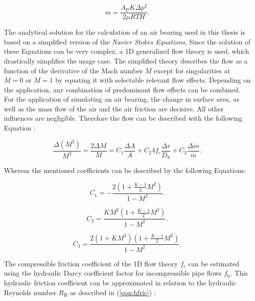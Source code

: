 \begin{equation}
\dot{m} = \frac{A_\text{P} K \Delta p^{2} }{2 \mu R T H} .
\label{eqn:massf2}
\end{equation}


The analytical solution for the calculation of an air bearing used in this thesis is based on a simplified version of the\textit{ Navier Stokes Equations}. Since the solution of these Equations can be very complex, a 1D generalized flow theory is used, which drastically simplifies the usage case. The simplified theory describes the flow as a function of the derivative of the Mach number $ M $ except for singularities at $M = 0$ or $M = 1$ by equating it with selectable relevant flow effects. Depending on the application, any combination of predominant flow effects can be combined.\\
For the application of simulating an air bearing, the change in surface area, as well as the mass flow of the air and the air friction are decisive. All other influences are negligible. 
Therefore the flow can be described with the following Equation \cite{Plante.2005}:


\begin{equation}
\frac{ \Delta (M^{2})}{M^{2}} = \frac{2 \Delta M}{M} = C_\text{1}\frac{ \Delta A}{A} + C_\text{2} 4 f_\text{c} \frac{ \Delta r}{D_\text{h}} + C_\text{3}\dfrac{ \Delta \dot m}{\dot m} .
\label{eqn:1D}
\end{equation}


Whereas the mentioned coefficients can be described by the following Equations:


\begin{equation}
C_\text{1} = - \frac{2(1 + \frac{K - 1}{2} M^{2})}{1 - M^{2}} .
\label{eqn:1D_C1}
\end{equation}

\begin{equation}
C_\text{2} = \frac{K M^{2} ( 1 + \frac{K - 1}{2} M^{2})}{1 - M^{2}} .
\label{eqn:1D_C2}
\end{equation}

\begin{equation}
C_\text{3} = \frac{2 ( 1 + K M^{2}) (1 + \frac{K - 1}{2} M^{2})}{1 - M^{2}} .
\label{eqn:1D_C3}
\end{equation}

The compressible friction coefficient of the 1D flow theory $f_\text{c}$ can be estimated using the hydraulic Darcy coefficient factor for incompressible pipe flows $f_\text{h}$. This hydraulic friction coefficient can be approximated in relation to the hydraulic Reynolds number $R_\text{H}$ as described in (\ref{eqn:hfric}) \cite{Plante.2005}:

